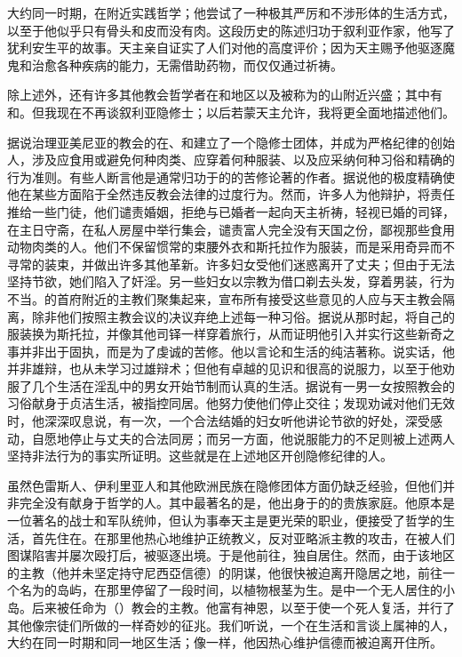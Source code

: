 大约同一时期，在附近实践哲学；他尝试了一种极其严厉和不涉形体的生活方式，以至于他似乎只有骨头和皮而没有肉。这段历史的陈述归功于叙利亚作家，他写了犹利安生平的故事。天主亲自证实了人们对他的高度评价；因为天主赐予他驱逐魔鬼和治愈各种疾病的能力，无需借助药物，而仅仅通过祈祷。\par

除上述外，还有许多其他教会哲学者在和地区以及被称为的山附近兴盛；其中有和。但我现在不再谈叙利亚隐修士；以后若蒙天主允许，我将更全面地描述他们。\par

据说治理亚美尼亚的教会的在、和建立了一个隐修士团体，并成为严格纪律的创始人，涉及应食用或避免何种肉类、应穿着何种服装、以及应采纳何种习俗和精确的行为准则。有些人断言他是通常归功于的的苦修论著的作者。据说他的极度精确使他在某些方面陷于全然违反教会法律的过度行为。然而，许多人为他辩护，将责任推给一些门徒，他们谴责婚姻，拒绝与已婚者一起向天主祈祷，轻视已婚的司铎，在主日守斋，在私人房屋中举行集会，谴责富人完全没有天国之份，鄙视那些食用动物肉类的人。他们不保留惯常的束腰外衣和斯托拉作为服装，而是采用奇异而不寻常的装束，并做出许多其他革新。许多妇女受他们迷惑离开了丈夫；但由于无法坚持节欲，她们陷入了奸淫。另一些妇女以宗教为借口剃去头发，穿着男装，行为不当。的首府附近的主教们聚集起来，宣布所有接受这些意见的人应与天主教会隔离，除非他们按照主教会议的决议弃绝上述每一种习俗。据说从那时起，将自己的服装换为斯托拉，并像其他司铎一样穿着旅行，从而证明他引入并实行这些新奇之事并非出于固执，而是为了虔诚的苦修。他以言论和生活的纯洁著称。说实话，他并非雄辩，也从未学习过雄辩术；但他有卓越的见识和很高的说服力，以至于他劝服了几个生活在淫乱中的男女开始节制而认真的生活。据说有一男一女按照教会的习俗献身于贞洁生活，被指控同居。他努力使他们停止交往；发现劝诫对他们无效时，他深深叹息说，有一次，一个合法结婚的妇女听他讲论节欲的好处，深受感动，自愿地停止与丈夫的合法同房；而另一方面，他说服能力的不足则被上述两人坚持非法行为的事实所证明。这些就是在上述地区开创隐修纪律的人。\par

虽然色雷斯人、伊利里亚人和其他欧洲民族在隐修团体方面仍缺乏经验，但他们并非完全没有献身于哲学的人。其中最著名的是，他出身于的的贵族家庭。他原本是一位著名的战士和军队统帅，但认为事奉天主是更光荣的职业，便接受了哲学的生活，首先住在。在那里他热心地维护正统教义，反对亚略派主教的攻击，在被人们图谋陷害并屡次殴打后，被驱逐出境。于是他前往，独自居住。然而，由于该地区的主教（他并未坚定持守尼西亞信德）的阴谋，他很快被迫离开隐居之地，前往一个名为的岛屿，在那里停留了一段时间，以植物根茎为生。是中一个无人居住的小岛。后来被任命为（）教会的主教。他富有神恩，以至于使一个死人复活，并行了其他像宗徒们所做的一样奇妙的征兆。我们听说，一个在生活和言谈上属神的人，大约在同一时期和同一地区生活；像一样，他因热心维护信德而被迫离开住所。\par

